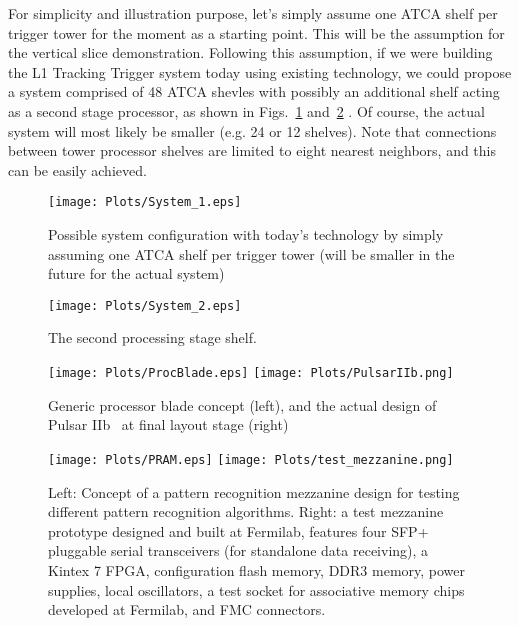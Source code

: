 \noindent For simplicity and illustration purpose, let's simply assume one ATCA shelf per trigger tower for the moment as a starting point. This will be the assumption for the vertical slice demonstration. Following this assumption, if we were building the L1 Tracking Trigger system today using existing technology, we could propose a system comprised of 48 ATCA shevles with possibly an additional shelf acting as a second stage processor, as shown in Figs.~\ref{fig:System_1} and~\ref{fig:System_2} . Of course, the actual system will most likely be smaller (e.g. 24 or 12 shelves). Note that connections between tower processor shelves are limited to eight nearest neighbors, and this can be easily achieved.

\begin{figure}[ht!]
\centering
\texttt{[image: Plots/System\_1.eps]}
\caption{Possible system configuration with today's technology by simply assuming one ATCA shelf per trigger tower (will be smaller in the future for the actual system)}
\label{fig:System_1}
\end{figure}

\begin{figure}[ht!]
\centering
\texttt{[image: Plots/System\_2.eps]}
\caption{The second processing stage shelf.}
\label{fig:System_2}
\end{figure}



\begin{figure}[ht!]
\centering
\texttt{[image: Plots/ProcBlade.eps]}
\texttt{[image: Plots/PulsarIIb.png]}
\caption{Generic processor blade concept (left), and the actual design of Pulsar IIb~\cite{bib:PulsarII} at final layout stage (right)}
\label{fig:ProcBlade}
\end{figure}

\begin{figure}[ht!]
\centering
\texttt{[image: Plots/PRAM.eps]}
\texttt{[image: Plots/test\_mezzanine.png]}
\caption{Left: Concept of a pattern recognition mezzanine design for testing different pattern recognition algorithms.
Right: a test mezzanine prototype designed and built at Fermilab, features four SFP+ pluggable serial transceivers (for standalone
data receiving), a Kintex 7 FPGA, configuration flash memory, DDR3 memory, power supplies, local oscillators, a test socket for
associative memory chips developed at Fermilab, and FMC connectors. 
}
\label{fig:PRAM}
\end{figure}

